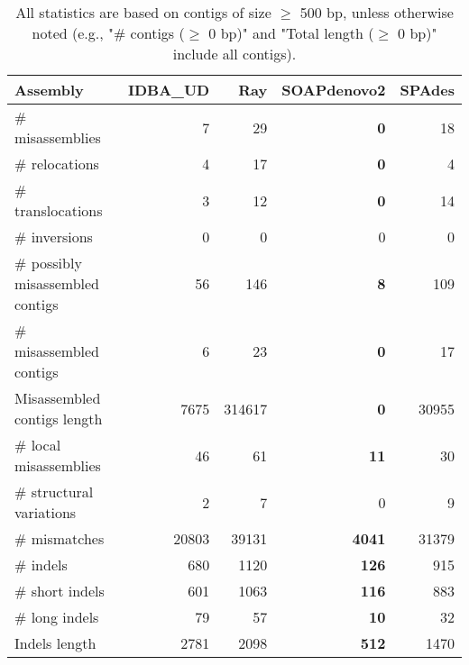\documentclass[12pt,a4paper]{article}
\begin{document}
\begin{table}[ht]
\begin{center}
\caption{All statistics are based on contigs of size $\geq$ 500 bp, unless otherwise noted (e.g., "\# contigs ($\geq$ 0 bp)" and "Total length ($\geq$ 0 bp)" include all contigs).}
\begin{tabular}{|l*{4}{|r}|}
\hline
Assembly & IDBA\_UD & Ray & SOAPdenovo2 & SPAdes \\ \hline
\# misassemblies & 7 & 29 & {\bf 0} & 18 \\ \hline
\hspace{5mm}\# relocations & 4 & 17 & {\bf 0} & 4 \\ \hline
\hspace{5mm}\# translocations & 3 & 12 & {\bf 0} & 14 \\ \hline
\hspace{5mm}\# inversions & 0 & 0 & 0 & 0 \\ \hline
\# possibly misassembled contigs & 56 & 146 & {\bf 8} & 109 \\ \hline
\# misassembled contigs & 6 & 23 & {\bf 0} & 17 \\ \hline
Misassembled contigs length & 7675 & 314617 & {\bf 0} & 30955 \\ \hline
\# local misassemblies & 46 & 61 & {\bf 11} & 30 \\ \hline
\# structural variations & 2 & 7 & 0 & 9 \\ \hline
\# mismatches & 20803 & 39131 & {\bf 4041} & 31379 \\ \hline
\# indels & 680 & 1120 & {\bf 126} & 915 \\ \hline
\hspace{5mm}\# short indels & 601 & 1063 & {\bf 116} & 883 \\ \hline
\hspace{5mm}\# long indels & 79 & 57 & {\bf 10} & 32 \\ \hline
Indels length & 2781 & 2098 & {\bf 512} & 1470 \\ \hline
\end{tabular}
\end{center}
\end{table}
\end{document}
